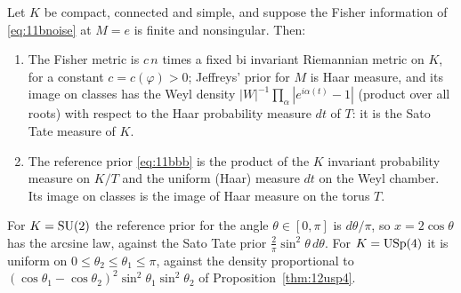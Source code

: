 \begin{proposition}\label{thm:11brefprior}
Let $K$ be compact, connected and simple, and suppose the Fisher information of \eqref{eq:11bnoise} at $M=e$ is finite and nonsingular. Then:
\begin{enumerate}
\item[(i)] The Fisher metric is $c\,n$ times a fixed bi invariant Riemannian metric on $K$, for a constant $c=c(\varphi)>0$; Jeffreys' prior for $M$ is Haar measure, and its image on classes has the Weyl density $|W|^{-1}\prod_{\alpha}|e^{i\alpha(t)}-1|$ (product over all roots) with respect to the Haar probability measure $dt$ of $T$: it is the Sato Tate measure of $K$.
\item[(ii)] The reference prior \eqref{eq:11bbb} is the product of the $K$ invariant probability measure on $K/T$ and the uniform (Haar) measure $dt$ on the Weyl chamber. Its image on classes is the image of Haar measure on the torus $T$.
\end{enumerate}
For $K=\mathrm{SU}(2)$ the reference prior for the angle $\theta\in[0,\pi]$ is $d\theta/\pi$, so $x=2\cos\theta$ has the arcsine law, against the Sato Tate prior $\frac2\pi\sin^2\theta\,d\theta$. For $K=\mathrm{USp}(4)$ it is uniform on $0\le\theta_2\le\theta_1\le\pi$, against the density proportional to $(\cos\theta_1-\cos\theta_2)^2\sin^2\theta_1\sin^2\theta_2$ of Proposition~\ref{thm:12usp4}.
\end{proposition}

